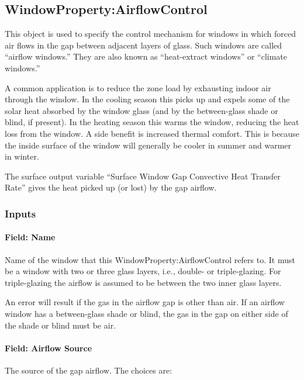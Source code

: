 \subsection{WindowProperty:AirflowControl}\label{windowpropertyairflowcontrol}

This object is used to specify the control mechanism for windows in which forced air flows in the gap between adjacent layers of glass. Such windows are called ``airflow windows.'' They are also known as ``heat-extract windows'' or ``climate windows.''

A common application is to reduce the zone load by exhausting indoor air through the window. In the cooling season this picks up and expels some of the solar heat absorbed by the window glass (and by the between-glass shade or blind, if present). In the heating season this warms the window, reducing the heat loss from the window. A side benefit is increased thermal comfort. This is because the inside surface of the window will generally be cooler in summer and warmer in winter.

The surface output variable ``Surface Window Gap Convective Heat Transfer Rate'' gives the heat picked up (or lost) by the gap airflow.

\subsubsection{Inputs}\label{inputs-34-001}

\paragraph{Field: Name}\label{field-name-31-001}

Name of the window that this WindowProperty:AirflowControl refers to. It must be a window with two or three glass layers, i.e., double- or triple-glazing. For triple-glazing the airflow is assumed to be between the two inner glass layers.

An error will result if the gas in the airflow gap is other than air. If an airflow window has a between-glass shade or blind, the gas in the gap on either side of the shade or blind must be air.

\paragraph{Field: Airflow Source}\label{field-airflow-source}

The source of the gap airflow. The choices are:

